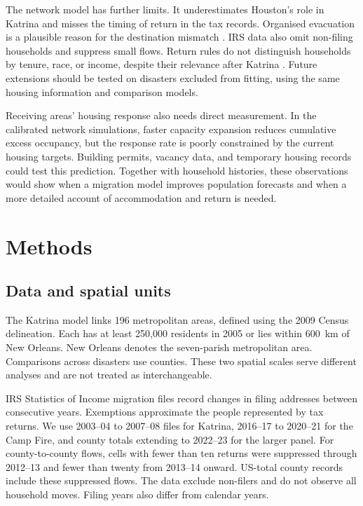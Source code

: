\documentclass[11pt]{article}
\begin{document}
The network model has further limits. It underestimates Houston's role in Katrina and misses the timing of return in the tax records. Organised evacuation is a plausible reason for the destination mismatch \citep{McIntosh2008}. IRS data also omit non-filing households and suppress small flows. Return rules do not distinguish households by tenure, race, or income, despite their relevance after Katrina \citep{Fussell2010,GroenPolivka2010}. Future extensions should be tested on disasters excluded from fitting, using the same housing information and comparison models.

Receiving areas' housing response also needs direct measurement. In the calibrated network simulations, faster capacity expansion reduces cumulative excess occupancy, but the response rate is poorly constrained by the current housing targets. Building permits, vacancy data, and temporary housing records could test this prediction. Together with household histories, these observations would show when a migration model improves population forecasts and when a more detailed account of accommodation and return is needed.


\section*{Methods}\label{sec:methods}\label{sec:model}

\subsection*{Data and spatial units}

The Katrina model links 196 metropolitan areas, defined using the 2009 Census delineation. Each has at least 250{,}000 residents in 2005 or lies within 600~km of New Orleans. New Orleans denotes the seven-parish metropolitan area. Comparisons across disasters use counties. These two spatial scales serve different analyses and are not treated as interchangeable.

IRS Statistics of Income migration files record changes in filing addresses between consecutive years. Exemptions approximate the people represented by tax returns. We use 2003--04 to 2007--08 files for Katrina, 2016--17 to 2020--21 for the Camp Fire, and county totals extending to 2022--23 for the larger panel. For county-to-county flows, cells with fewer than ten returns were suppressed through 2012--13 and fewer than twenty from 2013--14 onward. US-total county records include these suppressed flows. The data exclude non-filers and do not observe all household moves. Filing years also differ from calendar years.
\end{document}
